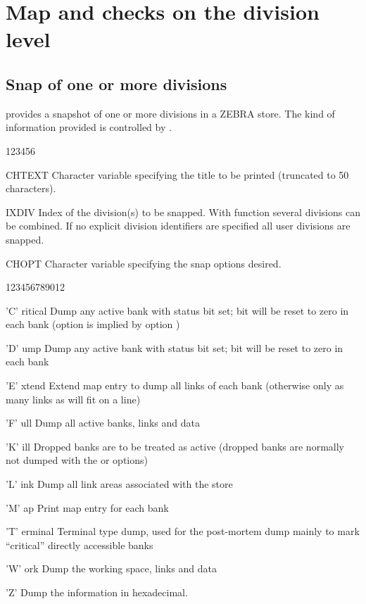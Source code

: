 \newpage

\section{Map and checks on the division level}
\subsection{Snap of one or more divisions}
\label{sec:DZSNAP}


\Action
{} provides a snapshot of one or more divisions in a ZEBRA
store. The kind of information provided is controlled by .

\begin{DLtt}{123456}
\item[CHTEXT] Character variable specifying the title to be printed
      (truncated to 50 characters).
\item[IXDIV]  Index of the division(s) to be snapped.
      With function  several divisions can be combined.
      If no explicit division identifiers are specified
      all user divisions are snapped.
\item[CHOPT]Character variable specifying the snap options desired.
\begin{DLttc}{123456789012}
\item['C' ritical]Dump any active bank with status bit  set;
bit  will be reset to zero in each bank
(option  is implied by option )
\item['D' ump]Dump any active bank with status bit  set;
bit  will be reset to zero in each bank
\item['E' xtend]Extend map entry to dump all links of each bank
(otherwise only as many links as will fit on a line)
\item['F' ull]Dump all active banks, links and data
\item['K' ill]Dropped banks are to be treated as active
(dropped banks are normally not dum\-ped with the  or  options)
\item['L' ink]Dump all link areas associated with the store
\item['M' ap]Print map entry for each bank
\item['T' erminal]Terminal type dump, used for the post-mortem dump
mainly to mark ``critical'' directly accessible banks
\item['W' ork]Dump the working space, links and data
\item['Z']Dump the information in hexadecimal.
\end{DLttc}
\end{DLtt}

